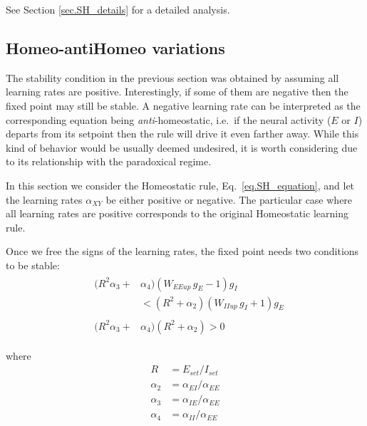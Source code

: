\documentclass[twocolumn]{article}
\newcommand{\EE}{\mathit{EE}}
\newcommand{\EI}{\mathit{EI}}
\newcommand{\IE}{\mathit{IE}}
\newcommand{\II}{\mathit{II}}
\newcommand{\XY}{\mathit{XY}}
\newcommand{\set}{\mathit{set}}
\newcommand{\up}{\mathit{up}}
\begin{document}
See Section \ref{sec.SH_details} for a detailed analysis.



\subsection{Homeo-antiHomeo variations}

The stability condition in the previous section was obtained by assuming all learning rates are positive. Interestingly, if some of them are negative then the fixed point may still be stable. A negative learning rate can be interpreted as the corresponding equation being {\em anti}-homeostatic, i.e.\ if the neural activity ($E$ or $I$) departs from its setpoint then the rule will drive it even farther away. While this kind of behavior would be usually deemed undesired, it is worth considering due to its relationship with the paradoxical regime.

In this section we consider the Homeostatic rule, Eq.\ \ref{eq.SH_equation}, and let the learning rates $\alpha_{\XY}$ be either positive or negative. The particular case where all learning rates are positive corresponds to the original Homeostatic learning rule.

Once we free the signs of the learning rates, the fixed point needs two conditions to be stable:
\begin{eqnarray}
& \begin{aligned}
(R^2 \alpha_3 + & \alpha_4)(W_{\EE\up} \, g_E  - 1)g_I \\
& < (R^2 + \alpha_2)(W_{\II\up} \, g_I + 1)g_E
\end{aligned}
\label{eq.HaH_stable_cond1} \\
& \begin{aligned}
(R^2 \alpha_3 + & \alpha_4)(R^2 + \alpha_2) > 0
\end{aligned}
\label{eq.HaH_stable_cond2}
\end{eqnarray}

\noindent where
\begin{displaymath}
\begin{aligned}
R & = E_{\set}/I_{\set} \\
\alpha_2 & = \alpha_{\EI}/\alpha_{\EE} \\
\alpha_3 & = \alpha_{\IE}/\alpha_{\EE} \\
\alpha_4 & = \alpha_{\II}/\alpha_{\EE}
\end{aligned}
\end{displaymath}
\end{document}
